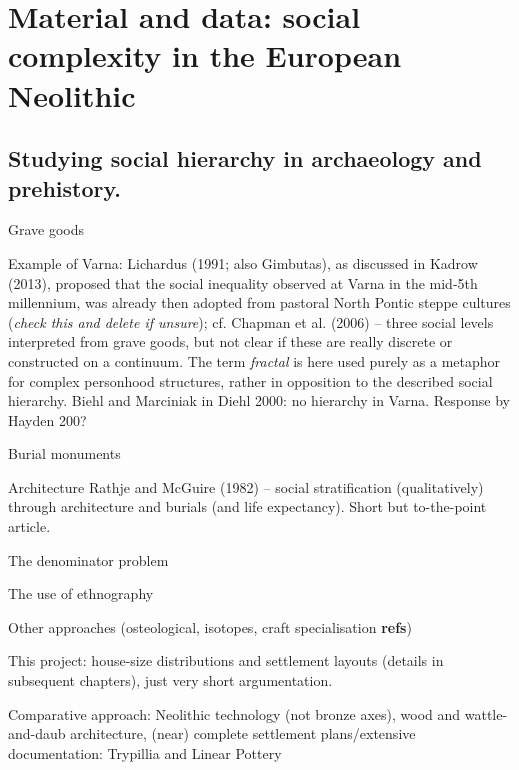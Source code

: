 \documentclass[
  12pt,
  a4paper, twoside]{book}
\begin{document}
\hypertarget{material}{%
\chapter{Material and data: social complexity in the European Neolithic}\label{material}}

\hypertarget{complexity-archaeo}{%
\section{Studying social hierarchy in archaeology and prehistory.}\label{complexity-archaeo}}

Grave goods

Example of Varna: Lichardus (1991; also Gimbutas), as discussed in Kadrow (2013), proposed that the social inequality observed at Varna in the mid-5th millennium, was already then adopted from pastoral North Pontic steppe cultures (\emph{check this and delete if unsure}); cf. Chapman et al. (2006) -- three social levels interpreted from grave goods, but not clear if these are really discrete or constructed on a continuum. The term \emph{fractal} is here used purely as a metaphor for complex personhood structures, rather in opposition to the described social hierarchy. Biehl and Marciniak in Diehl 2000: no hierarchy in Varna. Response by Hayden 200?

Burial monuments

Architecture Rathje and McGuire (1982) -- social stratification (qualitatively) through architecture and burials (and life expectancy). Short but to-the-point article.

The denominator problem

The use of ethnography

Other approaches (osteological, isotopes, craft specialisation \textbf{refs})

This project: house-size distributions and settlement layouts (details in subsequent chapters), just very short argumentation.

Comparative approach: Neolithic technology (not bronze axes), wood and wattle-and-daub architecture, (near) complete settlement plans/extensive documentation: Trypillia and Linear Pottery
\end{document}
